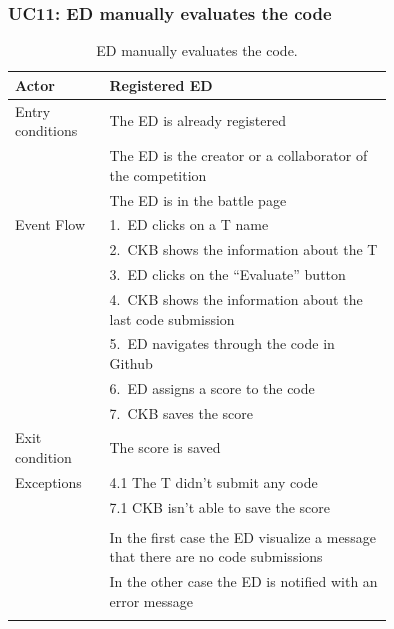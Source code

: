 \subsubsection*{UC11: ED manually evaluates the code}
\begin{center}
  \begin{longtable}{l|p{0.75\linewidth}}
    \hline
    Actor & Registered ED \\
    \hline
    Entry conditions & The ED is already registered  \\
    & The ED is the creator or a collaborator of the competition \\
    & The ED is in the battle page \\
    \hline
    Event Flow & 1.\ ED clicks on a T name \\
    & 2.\ CKB shows the information about the T \\
    & 3.\ ED clicks on the “Evaluate” button \\
    & 4.\ CKB shows the information about the last code submission \\
    & 5.\ ED navigates through the code in Github\\
    & 6.\ ED assigns a score to the code \\
    & 7.\ CKB saves the score \\
    \hline
    Exit condition &  The score is saved \\
    \hline
    Exceptions & 4.1 The T didn't submit any code \\
    & 7.1 CKB isn’t able to save the score \\ \\
    & In the first case the ED visualize a message that there are no code submissions \\
    & In the other case the ED is notified with an error message \\
    \hline
    \caption{ED manually evaluates the code.}
    \label{tab: ED_evaluate_code}
  \end{longtable}


\end{center}
